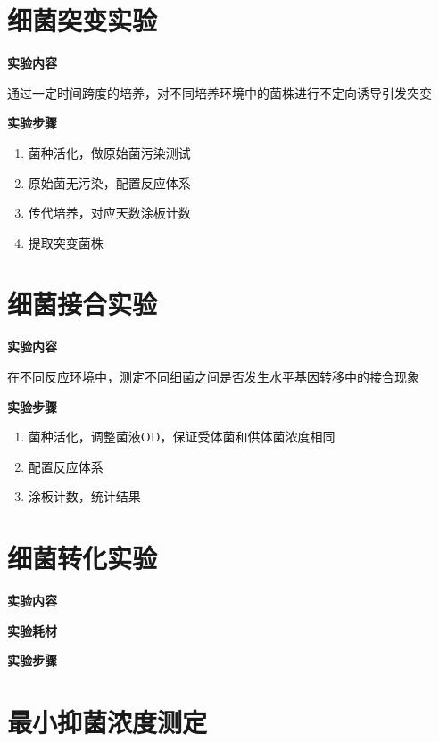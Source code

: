 \documentclass[
]{book}
\providecommand{\tightlist}{%
  \setlength{\itemsep}{0pt}\setlength{\parskip}{0pt}}
\begin{document}
\hypertarget{ux7ec6ux83ccux7a81ux53d8ux5b9eux9a8c}{%
\section{细菌突变实验}\label{ux7ec6ux83ccux7a81ux53d8ux5b9eux9a8c}}

\textbf{实验内容}

通过一定时间跨度的培养，对不同培养环境中的菌株进行不定向诱导引发突变

\textbf{实验步骤}

\begin{enumerate}
\def\labelenumi{\arabic{enumi}.}
\tightlist
\item
  菌种活化，做原始菌污染测试
\item
  原始菌无污染，配置反应体系
\item
  传代培养，对应天数涂板计数
\item
  提取突变菌株
\end{enumerate}

\hypertarget{ux7ec6ux83ccux63a5ux5408ux5b9eux9a8c}{%
\section{细菌接合实验}\label{ux7ec6ux83ccux63a5ux5408ux5b9eux9a8c}}

\textbf{实验内容}

在不同反应环境中，测定不同细菌之间是否发生水平基因转移中的接合现象

\textbf{实验步骤}

\begin{enumerate}
\def\labelenumi{\arabic{enumi}.}
\tightlist
\item
  菌种活化，调整菌液OD，保证受体菌和供体菌浓度相同
\item
  配置反应体系
\item
  涂板计数，统计结果
\end{enumerate}

\hypertarget{ux7ec6ux83ccux8f6cux5316ux5b9eux9a8c}{%
\section{细菌转化实验}\label{ux7ec6ux83ccux8f6cux5316ux5b9eux9a8c}}

\textbf{实验内容}

\textbf{实验耗材}

\textbf{实验步骤}

\hypertarget{ux6700ux5c0fux6291ux83ccux6d53ux5ea6ux6d4bux5b9a}{%
\section{最小抑菌浓度测定}\label{ux6700ux5c0fux6291ux83ccux6d53ux5ea6ux6d4bux5b9a}}
\end{document}
